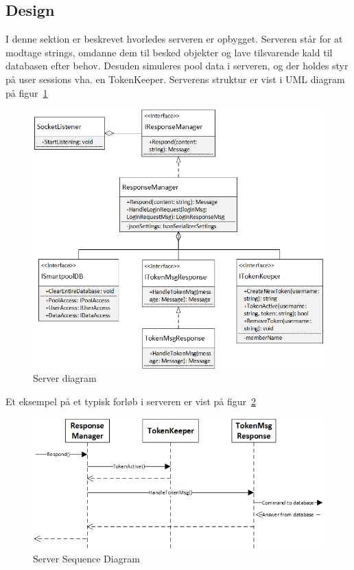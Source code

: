 \subsection{Design}
I denne sektion er beskrevet hvorledes serveren er opbygget. Serveren står for at modtage strings, omdanne dem til besked objekter og lave tilsvarende kald til databasen efter behov. Desuden simuleres pool data i serveren, og der holdes styr på user sessions vha. en TokenKeeper. Serverens struktur er vist i UML diagram på figur~\ref{fig:ConnectionServer}
\begin{figure}
\centering
\includegraphics[width=0.9\linewidth]{figs/connection/ConnectionServer.png}
\caption{Server diagram}
\label{fig:ConnectionServer}
\end{figure}

Et eksempel på et typisk forløb i serveren er vist på figur~\ref{fig:ServerSequenceResponse}
\begin{figure}
\centering
\includegraphics[width=0.9\linewidth]{figs/connection/ServerSequenceResponse.png}
\caption{Server Sequence Diagram}
\label{fig:ServerSequenceResponse}
\end{figure}

